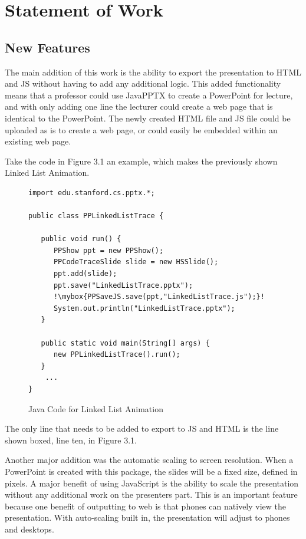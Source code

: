 \documentclass[12pt,twoside]{reedthesis}
\newcommand{\mybox}{%
    \collectbox{%
        \setlength{\fboxsep}{2pt}%
        \fbox{\BOXCONTENT}%
    }%
}
\begin{document}
\section{Statement of Work}

\subsection{New Features}
The main addition of this work is the ability to export the presentation to HTML and JS without having to add any additional logic. This added functionality means that a professor could use JavaPPTX to create a PowerPoint for lecture, and with only adding one line the lecturer could create a web page that is identical to the PowerPoint. The newly created HTML file and JS file could be uploaded as is to create a web page, or could easily be embedded within an existing web page. 

Take the code in Figure 3.1 an example, which makes the previously shown Linked List Animation.
\begin{figure}[h!tbp]
\caption{Java Code for Linked List Animation} 
\begin{lstlisting}[escapechar=!]
import edu.stanford.cs.pptx.*;

public class PPLinkedListTrace {

   public void run() {
      PPShow ppt = new PPShow();
      PPCodeTraceSlide slide = new HSSlide();
      ppt.add(slide);
      ppt.save("LinkedListTrace.pptx");
      !\mybox{PPSaveJS.save(ppt,"LinkedListTrace.js");}!
      System.out.println("LinkedListTrace.pptx");
   }

   public static void main(String[] args) {
      new PPLinkedListTrace().run();
   }
	...
}
\end{lstlisting}
\end{figure}
The only line that needs to be added to export to JS and HTML is the line shown boxed, line ten, in Figure 3.1.

Another major addition was the automatic scaling to screen resolution. When a PowerPoint is created with this package, the slides will be a fixed size, defined in pixels. A major benefit of using JavaScript is the ability to scale the presentation without any additional work on the presenters part. This is an important feature because one benefit of outputting to web is that phones can natively view the presentation. With auto-scaling built in, the presentation will adjust to phones and desktops. 
\end{document}
